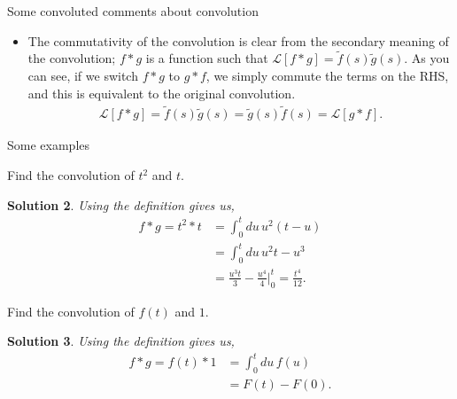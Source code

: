 \documentclass[11pt]{article}
\newtheorem*{solution}{Solution}
\theoremstyle{mystyle}
\begin{document}
\begin{psremark}{Some convoluted comments about convolution}{}
\begin{itemize}
\begin{solution}
\begin{align*}
        \end{align*}
        We want to make this double integral look something like a Laplace transform,
        so let's make a change of variables, $t = u + v$. Subbing this in gives us,
        \begin{align*}
            \int_0^\infty dv \int_0^\infty du \, f(u)g(v)e^{-s(u + v)}
            & = \int_0^\infty dt \underbrace{\int_0^t du \, f(u)g(t - u)}_{h(t)} e^{-st}.
        \end{align*}
        As you can see, if we define $h(t) \equiv \int_0^t du \, f(u) g(t - u)$,
        we get our desired result: $\mathcal{L}[h(t)] = \tilde{f}(s)\tilde{g}(s)$.
        Very cool.
        \end{solution}
        \item The commutativity of the convolution is clear
        from the secondary meaning of the convolution; $f * g$
        is a function such that $\mathcal{L}[f * g] = \tilde{f}(s)\tilde{g}(s)$.
        As you can see, if we switch $f * g$ to $g * f$, 
        we simply commute the terms on the RHS, and this 
        is equivalent to the original convolution.
        \begin{align*}
            \mathcal{L}[f * g] = \tilde{f}(s)\tilde{g}(s) = \tilde{g}(s)\tilde{f}(s) = \mathcal{L}[g * f].
        \end{align*}
    \end{itemize}
\end{psremark}

\begin{psexample}{Some examples}{}
    \begin{hwproblem}
        Find the convolution of $t^2$ and $t$.
    \end{hwproblem}
    \begin{solution}
        Using the definition gives us,
        \begin{align*}
            f * g = t^2 * t & = \int_0^t du \, u^2 (t - u)\\
            & = \int_0^t du \, u^2t - u^3\\
            & = \frac{u^3 t}{3} - \frac{u^4}{4} \Bigg|_0^t = \frac{t^4}{12}.
        \end{align*}
    \end{solution}
    \begin{hwproblem}
        Find the convolution of $f(t)$ and $1$.
    \end{hwproblem}
    \begin{solution}
        Using the definition gives us,
        \begin{align*}
            f * g = f(t) * 1 & = \int_0^t du \, f(u)\\
            & = F(t) - F(0).
        \end{align*}
    \end{solution}
\end{psexample}
\end{document}
